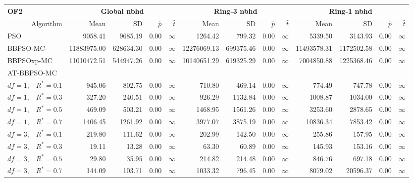 \documentclass[12pt]{article}
\begin{document}
\begin{table}[ht]
\centering
\tiny{
\begin{tabular}{r|rrrr|rrrr|rrrr}
\multicolumn{1}{l}{OF2} & \multicolumn{4}{c}{Global nbhd} & \multicolumn{4}{c}{Ring-3 nbhd} & \multicolumn{4}{c}{Ring-1 nbhd}\\
  \hline
Algorithm & Mean & SD & $\widehat{p}$ & $\widehat{t}$ & Mean & SD & $\widehat{p}$ & $\widehat{t}$ & Mean & SD & $\widehat{p}$ & $\widehat{t}$ \\
  \hline
\multicolumn{1}{l|}{PSO} & 9058.41 & 9685.19 & 0.00 & $\infty$ & 1264.42 & 799.32 & 0.00 & $\infty$ & 5339.50 & 3143.93 & 0.00 & $\infty$ \\ 
  \multicolumn{1}{l|}{BBPSO-MC} & 11883975.00 & 628634.30 & 0.00 & $\infty$ & 12276069.13 & 699375.46 & 0.00 & $\infty$ & 11493578.31 & 1172502.58 & 0.00 & $\infty$ \\ 
  \multicolumn{1}{l|}{BBPSOxp-MC} & 11010472.51 & 544947.26 & 0.00 & $\infty$ & 10140651.29 & 619325.29 & 0.00 & $\infty$ & 7004850.88 & 1225368.46 & 0.00 & $\infty$ \\ 
\hline
\multicolumn{1}{l|}{AT-BBPSO-MC} &&&&&&&&&&&&\\
  $df = 1,\enspace$ $R^* =0.1$ & 945.06 & 802.75 & 0.00 & $\infty$ & 710.80 & 469.14 & 0.00 & $\infty$ & 774.49 & 747.78 & 0.00 & $\infty$ \\ 
  $df = 1,\enspace$ $R^* =0.3$ & 327.20 & 240.51 & 0.00 & $\infty$ & 926.29 & 1132.84 & 0.00 & $\infty$ & 1008.87 & 1034.00 & 0.00 & $\infty$ \\ 
  $df = 1,\enspace$ $R^* =0.5$ & 469.09 & 503.21 & 0.00 & $\infty$ & 1468.95 & 1561.26 & 0.00 & $\infty$ & 3253.60 & 2878.65 & 0.00 & $\infty$ \\ 
  $df = 1,\enspace$ $R^* =0.7$ & 1406.45 & 1261.92 & 0.00 & $\infty$ & 3977.07 & 3875.19 & 0.00 & $\infty$ & 10836.34 & 7853.42 & 0.00 & $\infty$ \\ 
  $df = 3,\enspace$ $R^* =0.1$ & 219.80 & 111.62 & 0.00 & $\infty$ & 202.99 & 142.50 & 0.00 & $\infty$ & 255.86 & 157.95 & 0.00 & $\infty$ \\ 
  $df = 3,\enspace$ $R^* =0.3$ & 19.11 & 13.28 & 0.00 & $\infty$ & 63.30 & 60.89 & 0.00 & $\infty$ & 145.93 & 153.16 & 0.00 & $\infty$ \\ 
  $df = 3,\enspace$ $R^* =0.5$ & 29.80 & 35.95 & 0.00 & $\infty$ & 214.82 & 214.48 & 0.00 & $\infty$ & 846.76 & 697.18 & 0.00 & $\infty$ \\ 
  $df = 3,\enspace$ $R^* =0.7$ & 144.09 & 103.71 & 0.00 & $\infty$ & 1033.32 & 796.45 & 0.00 & $\infty$ & 8079.02 & 20596.37 & 0.00 & $\infty$ \\ 

\end{tabular}}
\end{table}
\end{document}
